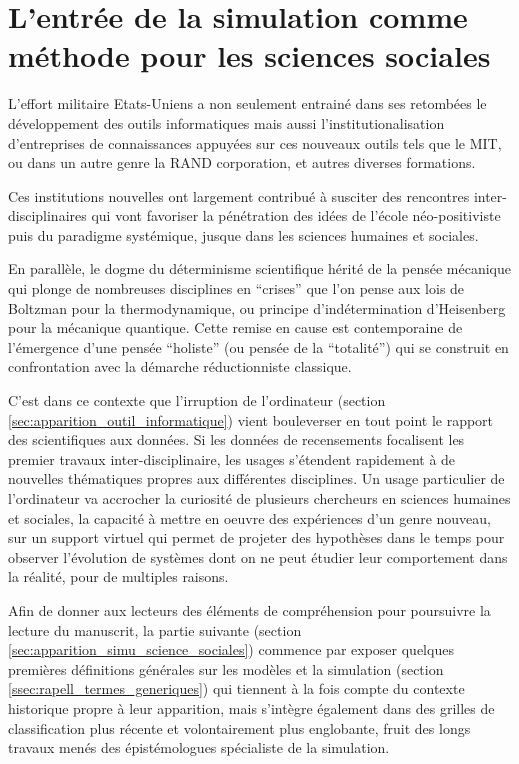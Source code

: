 
\section{L'entrée de la simulation comme méthode pour les sciences sociales}

L'effort militaire Etats-Uniens a non seulement entrainé dans ses retombées le développement des outils informatiques mais aussi l'institutionalisation d'entreprises de connaissances appuyées sur ces nouveaux outils tels que le MIT, ou dans un autre genre la RAND corporation, et autres diverses formations.

Ces institutions nouvelles ont largement contribué à susciter des rencontres inter-disciplinaires qui vont favoriser la pénétration des idées de l'école néo-positiviste puis du paradigme systémique, jusque dans les sciences humaines et sociales.

En parallèle, le dogme du déterminisme scientifique hérité de la pensée mécanique qui plonge de nombreuses disciplines en \enquote{crises} \autocite[20-23]{Pouvreau2013} que l'on pense aux lois de Boltzman pour la thermodynamique, ou principe d’indétermination d'Heisenberg pour la mécanique quantique. Cette remise en cause est contemporaine de l'émergence d'une pensée \enquote{holiste} (ou pensée de la \enquote{totalité}) qui se construit en confrontation avec la démarche réductionniste classique.

C'est dans ce contexte que l'irruption de l'ordinateur (section \ref{sec:apparition_outil_informatique}) vient bouleverser en tout point le rapport des scientifiques aux données. Si les données de recensements focalisent les premier travaux inter-disciplinaire, les usages s'étendent rapidement à de nouvelles thématiques propres aux différentes disciplines. Un usage particulier de l'ordinateur va accrocher la curiosité de plusieurs chercheurs en sciences humaines et sociales, la capacité à mettre en oeuvre des expériences d'un genre nouveau, sur un support virtuel qui permet de projeter des hypothèses dans le temps pour observer l'évolution de systèmes dont on ne peut étudier leur comportement dans la réalité, pour de multiples raisons.  

Afin de donner aux lecteurs des éléments de compréhension pour poursuivre la lecture du manuscrit, la partie suivante (section \ref{sec:apparition_simu_science_sociales}) commence par exposer quelques premières définitions générales sur les modèles et la simulation (section \ref{ssec:rapell_termes_generiques}) qui tiennent à la fois compte du contexte historique propre à leur apparition, mais s'intègre également dans des grilles de classification plus récente et volontairement plus englobante, fruit des longs travaux menés des épistémologues spécialiste de la simulation.

